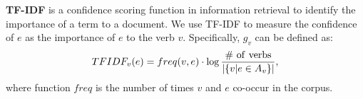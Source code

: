 \textbf{TF-IDF} is a confidence scoring function in information
retrieval to identify the importance of a term to a document.
We use TF-IDF to measure the confidence of $e$ as the importance
of $e$ to the verb $v$. Specifically, $g_v$ can be defined as:
\begin{equation}
TFIDF_v(e) = freq(v,e)\cdot \log\frac{\rm{\#\ of\ verbs}}{|\{v|e\in A_v\}|},
\end{equation}
where function $freq$ is the number of times $v$ and $e$ co-occur
in the corpus.


